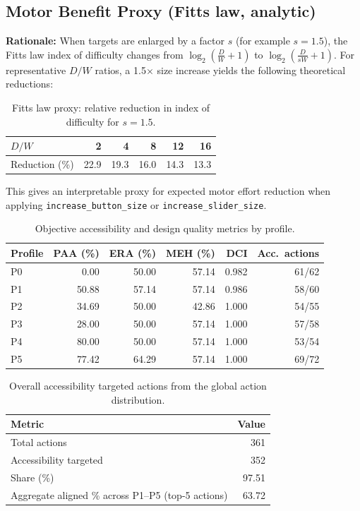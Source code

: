 \documentclass[openany]{book}
\begin{document}
\subsection{Motor Benefit Proxy (Fitts law, analytic)}
\textbf{Rationale:}
When targets are enlarged by a factor \(s\) (for example \(s{=}1.5\)), the Fitts law index of difficulty changes from \(\log_2(\frac{D}{W}+1)\) to \(\log_2(\frac{D}{sW}+1)\).
For representative \(D/W\) ratios, a 1.5\(\times\) size increase yields the following theoretical reductions:

\begin{table}[h]
\centering
\caption{Fitts law proxy: relative reduction in index of difficulty for \(s{=}1.5\).}
\begin{tabular}{lrrrrr}
\toprule
\(D/W\) & 2 & 4 & 8 & 12 & 16 \\
\midrule
Reduction (\%) & 22.9 & 19.3 & 16.0 & 14.3 & 13.3 \\
\bottomrule
\end{tabular}
\end{table}

This gives an interpretable proxy for expected motor effort reduction when applying \texttt{increase\_button\_size} or \texttt{increase\_slider\_size}.


\begin{table}[H]
\centering
\caption{Objective accessibility and design quality metrics by profile.}
\label{tab:obj-metrics}
\begin{tabular}{lrrrrr}
\toprule
\textbf{Profile} & \textbf{PAA (\%)} & \textbf{ERA (\%)} & \textbf{MEH (\%)} & \textbf{DCI} & \textbf{Acc.\ actions} \\
\midrule
P0 & 0.00 & 50.00 & 57.14 & 0.982 & 61/62 \\
P1 & 50.88 & 57.14 & 57.14 & 0.986 & 58/60 \\
P2 & 34.69 & 50.00 & 42.86 & 1.000 & 54/55 \\
P3 & 28.00 & 50.00 & 57.14 & 1.000 & 57/58 \\
P4 & 80.00 & 50.00 & 57.14 & 1.000 & 53/54 \\
P5 & 77.42 & 64.29 & 57.14 & 1.000 & 69/72 \\
\bottomrule
\end{tabular}
\end{table}

\begin{table}[H]
\centering
\caption{Overall accessibility targeted actions from the global action distribution.}
\label{tab:overall-accessible-share}
\begin{tabular}{lr}
\toprule
\textbf{Metric} & \textbf{Value} \\
\midrule
Total actions & 361 \\
Accessibility targeted & 352 \\
Share (\%) & 97.51 \\
\midrule
Aggregate aligned \% across P1--P5 (top-5 actions) & 63.72 \\
\bottomrule
\end{tabular}
\end{table}
\end{document}
